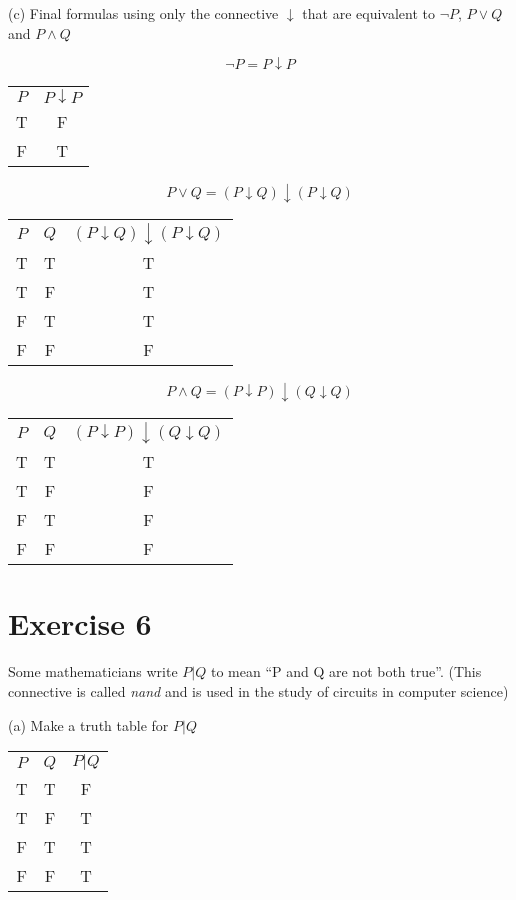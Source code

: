 \documentclass[11pt]{article}
\begin{document}
\noindent (c) Final formulas using only the connective $\downarrow$ that are equivalent to $\neg P$, $P \vee Q$ and $P \wedge Q$

$$\neg P = P \downarrow P$$

\begin{center}
\begin{tabular}{c c}
$P$ & $P \downarrow P$\\
T & F\\
F & T
\end{tabular}
\end{center}

$$P \vee Q = (P \downarrow Q) \downarrow (P \downarrow Q)$$

\begin{center}
\begin{tabular}{ c c c }
 $P$ & $Q$ & $(P \downarrow Q) \downarrow (P \downarrow Q)$\\ 
T & T & T\\  
T & F & T\\
F & T & T\\  
F & F & F
\end{tabular}
\end{center}

$$P \wedge Q = (P \downarrow P) \downarrow (Q \downarrow Q)$$

\begin{center}
\begin{tabular}{ c c c }
 $P$ & $Q$ & $(P \downarrow P) \downarrow (Q \downarrow Q)$\\ 
T & T & T\\  
T & F & F\\
F & T & F\\  
F & F & F
\end{tabular}
\end{center}

\section*{Exercise 6}

Some mathematicians write $P | Q$ to mean ``P and Q are not both true''.
(This connective is called \textit{nand} and is used in the study of circuits in computer science)

\noindent (a) Make a truth table for $P | Q$

\begin{center}
\begin{tabular}{ c c c }
 $P$ & $Q$ & $P | Q$\\ 
T & T & F\\  
T & F & T\\
F & T & T\\  
F & F & T
\end{tabular}
\end{center}
\end{document}
